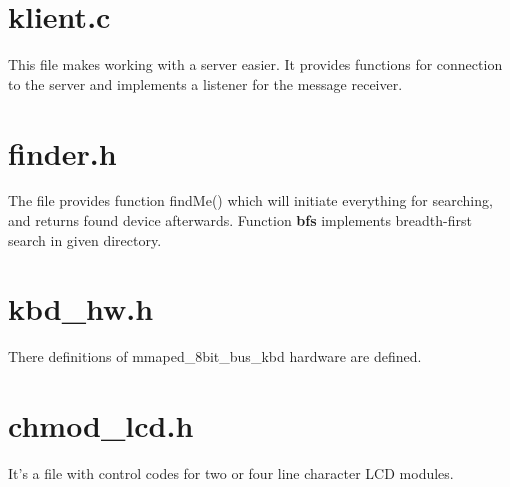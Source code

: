 \documentclass[12pt]{article}
\begin{document}
\section{klient.c}
This file makes working with a server easier. It provides functions for connection to the server and implements a listener for the message receiver. 

\section{finder.h}
The file provides function findMe() which will initiate everything for searching, and returns found device afterwards. Function \textbf{bfs} implements breadth-first search in given directory.

\section{kbd\_hw.h}
There definitions of mmaped\_8bit\_bus\_kbd hardware are defined.

\section{chmod\_lcd.h}
It's a file with control codes for two or four line character LCD modules.
\end{document}

